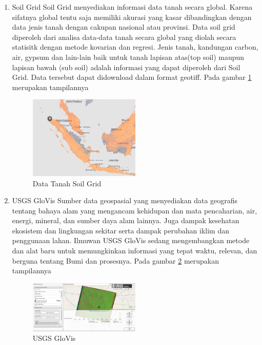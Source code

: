\begin{enumerate}
\item Soil Grid
Soil Grid menyediakan informasi data tanah secara global. Karena sifatnya global tentu saja memiliki akurasi yang kasar dibandingkan dengan data jenis tanah dengan cakupan nasional atau provinsi. Data soil grid diperoleh dari analisa data-data tanah secara global yang diolah secara statisitk dengan metode kovarian dan regresi. Jenis tanah, kandungan carbon, air, gypsum dan lain-lain baik untuk tanah lapisan atas(top soil) maupun lapisan bawah (sub soil) adalah informasi yang dapat diperoleh dari Soil Grid. Data tersebut dapat didownload dalam format geotiff.  Pada gambar \ref{labelgambar5} merupakan tampilannya  

\begin{figure}[ht]
\centering
\includegraphics[width=0.5\textwidth]{pictures/Data_Tanah_Soil_Grid}
\caption{Data Tanah Soil Grid}
\label{labelgambar5}
\end{figure}

\item USGS GloVis
Sumber data geospasial yang menyediakan data geografis tentang bahaya alam yang mengancam kehidupan dan mata pencaharian, air, energi, mineral, dan sumber daya alam lainnya. Juga dampak kesehatan ekosistem dan lingkungan sekitar serta dampak perubahan iklim dan penggunaan lahan. Ilmuwan USGS GloVis sedang mengembangkan metode dan alat baru untuk memungkinkan informasi yang tepat waktu, relevan, dan berguna tentang Bumi dan prosesnya.  Pada gambar \ref{labelgambar6} merupakan tampilannya  

\begin{figure}[ht]
\centering
\includegraphics[width=0.5\textwidth]{pictures/USGS_GloVis}
\caption{USGS GloVis}
\label{labelgambar6}
\end{figure}


\end{enumerate}
